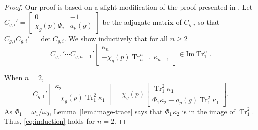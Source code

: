 \documentclass{amsart}
\numberwithin{equation}{section}
\newcommand{\Tr}{\operatorname{Tr}}
\newcommand{\image}{\mathrm{Im}}
\begin{document}
\begin{proof}
Our proof is based on a slight modification of the proof presented in \cite[Theorem~3.4]{BBL1}.
Let $C_{g,i}'=\begin{bmatrix}
    0&-1\\ \chi_g(p)\Phi_i&a_p(g)
\end{bmatrix}$ be the adjugate matrix of $C_{g,i}$ so that $C_{g,i}C_{g,i}'=\det C_{g,i}$. We show inductively that for all $n\ge2$
\begin{equation}
C_{g,1}'\cdots C_{g,n-1}'\begin{bmatrix}
    \kappa_n\\-\chi_g(p)\Tr_{n-1}^n\kappa_{n-1}
\end{bmatrix}\in\image\Tr_{1}^n.
\label{eq:induction}    
\end{equation}

When $n=2$,
\[C_{g,1}'\begin{bmatrix}
    \kappa_2\\-\chi_g(p)\Tr_{1}^2\kappa_{1}
\end{bmatrix}=
\chi_g(p)\begin{bmatrix}
    \Tr_{1}^2\kappa_{1}\\ 
    \Phi_1\kappa_2-a_p(g)\Tr_{1}^2\kappa_{1}
\end{bmatrix}.\]
As $\Phi_1=\omega_1/\omega_0$, Lemma~\ref{lem:image-trace} says that $\Phi_1\kappa_2$ is in the image of $\Tr^2_1$. Thus, \eqref{eq:induction} holds for $n=2$.


\end{proof}
\end{document}
